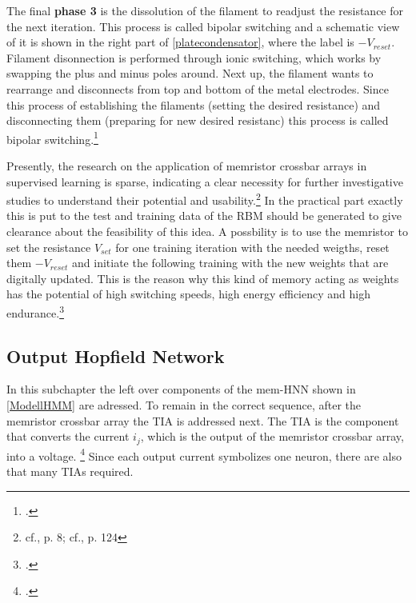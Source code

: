 The final \textbf{phase 3} is the dissolution of the filament to readjust the resistance for the next iteration.
This process is called bipolar switching and a schematic view of it is shown in the right part of \ref{platecondensator}, where the label is \(-V_{reset}\).
Filament disonnection is performed through ionic switching, which works by swapping the plus and minus poles around.
Next up, the filament wants to rearrange and disconnects from top and bottom of the metal electrodes. 
Since this process of establishing the filaments (setting the desired resistance) and disconnecting them (preparing for new desired resistanc) this process is called bipolar switching.\footcite[cf.][7]{sungPerspectiveReviewMemristive2018}

Presently, the research on the application of memristor crossbar arrays in supervised learning is sparse, indicating a clear necessity for further investigative studies to understand their potential and usability.\footnote{cf.\cite{amirsoleimaniInMemoryVectorMatrixMultiplication2020}, p. 8; cf.\cite{sungPerspectiveReviewMemristive2018}, p. 124}
In the practical part exactly this is put to the test and training data of the \ac{RBM} should be generated to give clearance about the feasibility of this idea.
A possbility is to use the memristor to set the resistance \(V_{set}\) for one training iteration with the needed weigths, reset them \(-V_{reset}\) and 
initiate the following training with the new weights that are digitally updated. 
This is the reason why this kind of memory acting as weights has the potential of high switching speeds, high energy efficiency and high endurance.\footcite[cf.][3]{amirsoleimaniInMemoryVectorMatrixMultiplication2020}


\subsection{Output Hopfield Network}

In this subchapter the left over components of the \ac{mem-HNN} shown in \ref{ModellHMM} are adressed.
To remain in the correct sequence, after the memristor crossbar array the \ac{TIA} is addressed next.
The \ac{TIA} is the component that converts the current \(i_j\), which is the output of the memristor crossbar array, into a voltage. \footcite[cf.][3]{hizzaniMemristorbasedHardwareAlgorithms2023}
Since each output current symbolizes one neuron, there are also that many \ac{TIA}s required.

